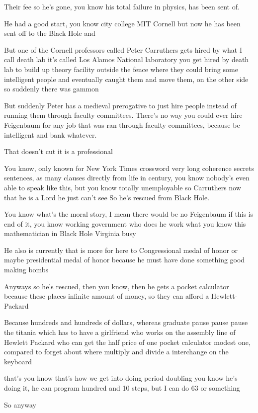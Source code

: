 \begin{description}
Their fee so he's gone, you know his total failure in physics, has
been sent of.

He had a good start, you know city college MIT
Cornell but now he has been sent off to the Black Hole and

But one of the Cornell professors called Peter Carruthers gets
hired by what I call death lab it's called Los Alamos National
laboratory you get hired by death lab to build up theory facility
outside the fence where they could bring some intelligent people
and eventually caught them and move them, on the other side so
suddenly there was gammon

But suddenly Peter has a medieval prerogative to just hire people
instead of running them through faculty committees. There's no
way you could ever hire Feigenbaum for any job that was ran through
faculty committees, because be intelligent and bank whatever.

That doesn't cut it is a professional

You know, only known for New York Times crossword very long
coherence secrets sentences, as many clauses directly from life in
century, you know nobody's even able to speak like this, but you
know totally unemployable so Carruthers now that he is a Lord he
just can't see So he's rescued from Black Hole.

You know what's the moral story, I mean there would be no
Feigenbaum if this is end of it, you know working government who
does he work what you know this mathematician in Black Hole
Virginia busy

He also is currently that is more for here to Congressional medal
of honor or maybe presidential medal of honor because he must have
done something good making bombs

Anyways so he's rescued, then you know, then he gets a pocket
calculator because these places infinite amount of money, so they
can afford a Hewlett-Packard

Because hundreds and hundreds of dollars, whereas graduate pause
pause pause the titania which has to have a girlfriend who works on
the assembly line of Hewlett Packard who can get the half price of
one pocket calculator modest one, compared to forget about where
multiply and divide a interchange on the keyboard

that's you know that's how we get into doing period doubling you
know he's doing it, he can program hundred and 10 steps, but I can
do 63 or something

So anyway


\end{description}
